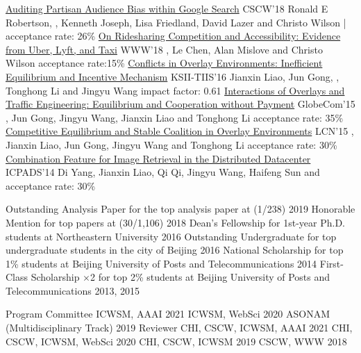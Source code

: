 \documentclass[letterpaper]{awesome-cv}
\begin{document}
\begin{cventries}
  \cvpub
    {\href{https://shanjiang.me/publications/cscw18b_paper.pdf}{Auditing Partisan Audience Bias within Google Search}}
    {CSCW'18}
    {Ronald E Robertson, , Kenneth Joseph, Lisa Friedland, David Lazer and Christo Wilson}
    { | acceptance rate: 26\%}
  \cvpub
    {\href{https://shanjiang.me/publications/www18_paper.pdf}{On Ridesharing Competition and Accessibility: Evidence from Uber, Lyft, and Taxi}}
    {WWW'18}
    {, Le Chen, Alan Mislove and Christo Wilson}
    {acceptance rate:15\%}
  \cvpub
    {\href{https://shanjiang.me/publications/tiis16_paper.pdf}{Conflicts in Overlay Environments: Inefficient Equilibrium and Incentive Mechanism}}
    {KSII-TIIS'16}
    {Jianxin Liao, Jun Gong, , Tonghong Li and Jingyu Wang}
    {impact factor: 0.61}
  \cvpub
    {\href{https://shanjiang.me/publications/globecom15_paper.pdf}{Interactions of Overlays and Traffic Engineering: Equilibrium and Cooperation without Payment}}
    {GlobeCom'15}
    {, Jun Gong, Jingyu Wang, Jianxin Liao and Tonghong Li}
    {acceptance rate: 35\%}
  \cvpub
    {\href{https://shanjiang.me/publications/lcn15_paper.pdf}{Competitive Equilibrium and Stable Coalition in Overlay Environments}}
    {LCN'15}
    {, Jianxin Liao, Jun Gong, Jingyu Wang and Tonghong Li}
    {acceptance rate: 30\%}
  \cvpub
    {\href{https://shanjiang.me/publications/icpads14_paper.pdf}{Combination Feature for Image Retrieval in the Distributed Datacenter}}
    {ICPADS'14}
    {Di Yang, Jianxin Liao, Qi Qi, Jingyu Wang, Haifeng Sun and }
    {acceptance rate: 30\%}
\end{cventries}

\addvspace{2ex}
\begin{cventries}
  \cvaward
    {Outstanding Analysis Paper}
    {for the top analysis paper at  (1/238)}
    {2019}
  \cvaward
    {Honorable Mention}
    {for top papers at  (30/1,106)}
    {2018}
  \cvaward
    {Dean's Fellowship}
    {for 1st-year Ph.D. students at Northeastern University}
    {2016}
  \cvaward
    {Outstanding Undergraduate}
    {for top undergraduate students in the city of Beijing}
    {2016}
  \cvaward
    {National Scholarship}
    {for top 1\% students at Beijing University of Posts and Telecommunications}
    {2014}
  \cvaward
    {First-Class Scholarship $\times$2}
    {for top 2\% students at Beijing University of Posts and Telecommunications}
    {2013, 2015}
\end{cventries}

\addvspace{2ex}
\begin{cventries}
  \cvaward
    {Program Committee}
    {ICWSM, AAAI}
    {2021}
 \cvaward
    {}
    {ICWSM, WebSci}
    {2020}
 \cvaward
    {}
    {ASONAM (Multidisciplinary Track)}
    {2019}
  \cvaward
    {Reviewer}
    {CHI, CSCW, ICWSM, AAAI}
    {2021}
  \cvaward
    {}
    {CHI, CSCW, ICWSM, WebSci}
    {2020}
  \cvaward
    {}
    {CHI, CSCW, ICWSM}
    {2019}
  \cvaward
    {}
    {CSCW, WWW}
    {2018}
\end{cventries}
\end{document}
